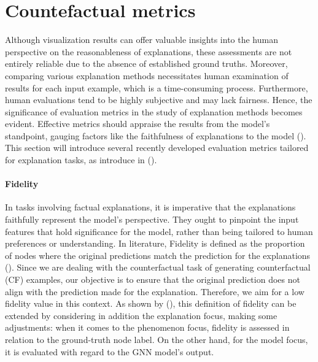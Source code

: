\documentclass[binding=0.6cm]{sapthesis}
\newcommand{\mycite}[1]{(\cite{#1})}
\begin{document}
\bigskip
\section{Countefactual metrics}
\label{sec:expRes.cf-metrics}
Although visualization results can offer valuable insights into the human perspective on the reasonableness of explanations, these assessments are not entirely reliable due to the absence of established ground truths. Moreover, comparing various explanation methods necessitates human examination of results for each input example, which is a time-consuming process. Furthermore, human evaluations tend to be highly subjective and may lack fairness.
Hence, the significance of evaluation metrics in the study of explanation methods becomes evident. Effective metrics should appraise the results from the model's standpoint, gauging factors like the faithfulness of explanations to the model \mycite{jacovi2020-faithfully,wiegreffe2019-attention-notnot}. This section will introduce several recently developed evaluation metrics tailored for explanation tasks, as introduce in \mycite{arrieta2020-taxo-xai}.


\paragraph{Fidelity} 
\label{sec:expRes.fidelity}
In tasks involving factual explanations, it is imperative that the explanations faithfully represent the model's perspective. They ought to pinpoint the input features that hold significance for the model, rather than being tailored to human preferences or understanding.
In literature, Fidelity is defined as the proportion of nodes where the original predictions match the prediction for the explanations (\cite{molnar2022,ribeiro2016-lime}). Since we are dealing with the counterfactual task of generating counterfactual (CF) examples, our objective is to ensure that the original prediction does not align with the prediction made for the explanation. Therefore, we aim for a low fidelity value in this context. As shown by \mycite{amara2022-graphFramEx}, this definition of fidelity can be extended by considering in addition the explanation focus, making some adjustments: when it comes to the phenomenon focus, fidelity is assessed in relation to the ground-truth node label. On the other hand, for the model focus, it is evaluated with regard to the GNN model's output.
\end{document}
